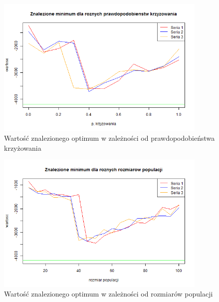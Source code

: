 \documentclass[11pt, a4paper]{article}
\begin{document}
\begin{figure}[H]
	\begin{center}
		\includegraphics[width=0.9\textwidth]{./assets/Schwefel3.png} %
		\caption{Wartość znalezionego optimum w zależności od prawdopodobieństwa krzyżowania}
		\label{fig:schwefel3}
	\end{center}
\end{figure}

\begin{figure}[H]
	\begin{center}
		\includegraphics[width=0.9\textwidth]{./assets/Schwefel4.png} %
		\caption{Wartość znalezionego optimum w zależności od rozmiarów populacji}
		\label{fig:schwefel4}
	\end{center}
\end{figure}
\end{document}
